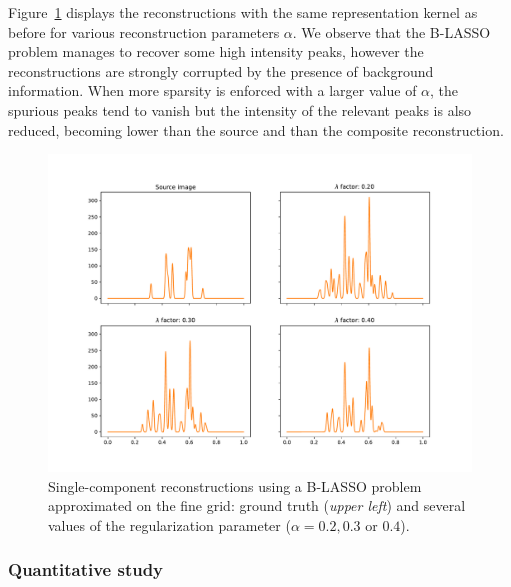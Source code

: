 \documentclass[12pt]{article}
\begin{document}
        Figure~\ref{fig:simple:blasso-conv} displays the reconstructions with the same representation kernel as before for various reconstruction parameters $\alpha$.
        We observe that the B-LASSO problem manages to recover some high intensity peaks, however the reconstructions are strongly corrupted by the presence of background information. When more sparsity is enforced with a larger value of $\alpha$, the spurious peaks tend to vanish but the intensity of the relevant peaks is also reduced, becoming lower than the source and than the composite reconstruction.

        \begin{figure}[t]
            \centering
            \includegraphics[width=\linewidth, trim=0 2cm 0 2.2cm, clip]{figures/simple_reco/blasso_merged.pdf}
            \caption{Single-component reconstructions using a B-LASSO problem approximated on the fine grid: ground truth (\textit{upper left}) and several values of the regularization parameter ($\alpha=0.2, 0.3$ or $0.4$). }
            \label{fig:simple:blasso-conv}
        \end{figure}
        
        \subsubsection{Quantitative study}
\end{document}
